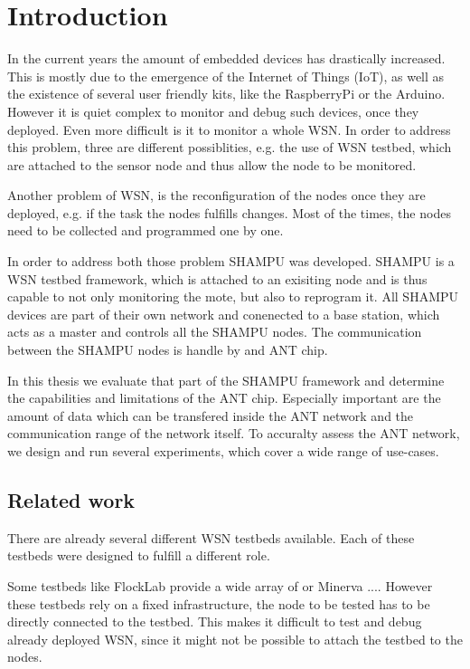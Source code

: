 \chapter{Introduction}
\label{sec:intro}
In the current years the amount of embedded devices has drastically increased. This is mostly due to the emergence of the Internet of Things (IoT), as well as the existence of several user friendly kits, like the RaspberryPi or the Arduino. However it is quiet complex to monitor and debug such devices, once they deployed. Even more difficult is it to monitor a whole WSN. In order to address this problem, three are different possiblities, e.g. the use of WSN testbed, which are attached to the sensor node and thus allow the node to be monitored.

Another problem of WSN, is the reconfiguration of the nodes once they are deployed, e.g. if the task the nodes fulfills changes. Most of the times, the nodes need to be collected and programmed one by one.

In order to address both those problem SHAMPU was developed. SHAMPU is a WSN testbed framework, which is attached to an exisiting node and is thus capable to not only monitoring the mote, but also to reprogram it. All SHAMPU devices are part of their own network and conenected to a base station, which acts as a master and controls all the SHAMPU nodes. The communication between the SHAMPU nodes is handle by and ANT chip.

In this thesis we evaluate that part of the SHAMPU framework and determine the capabilities and limitations of the ANT chip. Especially important are the amount of data which can be transfered inside the ANT network and the communication range of the network itself. To accuralty assess the ANT network, we design and run several experiments, which cover a wide range of use-cases.


\section{Related work}
\label{sec:related_work}
There are already several different WSN testbeds available. Each of these testbeds were designed to fulfill a different role. 

Some testbeds like FlockLab \cite{Lim2013} provide a wide array of  or Minerva \cite{Sommer} ....  However these testbeds rely on a fixed infrastructure, the node to be tested has to be directly connected to the testbed. This makes it difficult to test and debug already deployed WSN, since it might not be possible to attach the testbed to the nodes.

